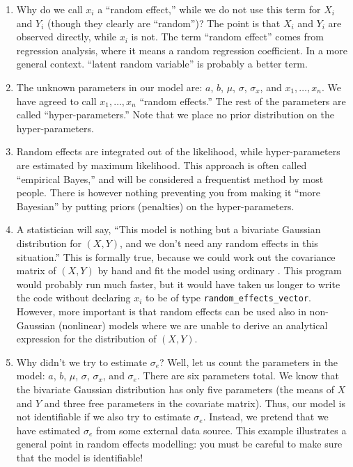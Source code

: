 \documentclass{admbmanual}
\begin{document}
\begin{enumerate}
  \item Why do we call $x_i$ a ``random effect,'' while we do not use this term
  for $X_i$ and $Y_i$ (though they clearly are ``random'')? The point is that
  $X_i$ and $Y_i$ are observed directly, while $x_i$ is not. The term ``random
  effect'' comes from regression analysis, where it means a random regression
  coefficient. In a more general context. ``latent random variable'' is probably
  a better term.

  \item The unknown parameters in our model are: $a$, $b$, $\mu$, $\sigma$,
  $\sigma_x$, and $x_1,\ldots,x_n$. We have agreed to call
  $x_1,\ldots,x_n$ ``random effects.'' The rest of the parameters are called
  ``hyper-parameters.'' Note that we place no prior distribution on the
  hyper-parameters.

  \item Random effects are integrated out of the likelihood, while
  hyper-parameters are estimated by maximum likelihood. 
  This approach is often called ``empirical Bayes,'' and will be considered a
  frequentist method by most people. There is however nothing preventing you
  from making it ``more Bayesian'' by putting priors (penalties) on the
  hyper-parameters.

  \item A statistician will say, ``This model is nothing but a bivariate
  Gaussian distribution for $(X,Y)$, and we don't need any random effects in
  this situation.'' This is formally true, because we could work out the
  covariance matrix of $(X,Y)$ by hand and fit the model using ordinary \scAB.
  This program would probably run much faster, but it would have taken us longer
  to write the code without declaring $x_i$ to be of type
  \texttt{random\_effects\_vector}. However, more important is that random
  effects can be used also in non-Gaussian (nonlinear) models where we are
  unable to derive an analytical expression for the distribution of $(X,Y)$.

  \item Why didn't we try to estimate $\sigma_e$? Well, let us count the
  parameters in the model: $a$, $b$, $\mu$, $\sigma$, $\sigma_x$, and
  $\sigma_e$. There are six parameters total. We know that the bivariate
  Gaussian distribution has only five parameters (the means of $X$ and $Y$ and
  three free parameters in the covariate matrix). Thus, our model is not
  identifiable if we also try to estimate $\sigma_e$. Instead, we pretend that
  we have estimated $\sigma_e$ from some external data source. This example
  illustrates a general point in random effects modelling: you must be careful
  to make sure that the model is identifiable!
\end{enumerate}
\end{document}
